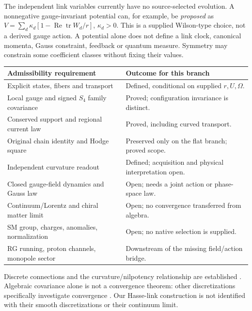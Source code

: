 \documentclass[11pt,a4paper]{article}
\newcommand{\tr}{\operatorname{tr}}
\begin{document}
The independent link variables currently have no source-selected
evolution. A nonnegative gauge-invariant potential can, for example,
be \emph{proposed} as
$V=\sum_d\kappa_d[1-\operatorname{Re}\tr W_d/r]$, $\kappa_d>0$.
This is a supplied Wilson-type choice, not a derived gauge action.
A potential alone does not define a link clock, canonical momenta,
Gauss constraint, feedback or quantum measure. Symmetry may constrain
some coefficient classes without fixing their values.

\begin{center}\small
\begin{tabular}{p{.35\linewidth}p{.56\linewidth}}
\toprule
Admissibility requirement & Outcome for this branch\\ \midrule
Explicit states, fibers and transport & Defined, conditional on supplied $r,U,\Omega$.\\
Local gauge and signed $S_4$ family covariance & Proved; configuration invariance is distinct.\\
Conserved support and regional current law & Proved, including curved transport.\\
Original chain identity and Hodge square & Preserved only on the flat branch; proved scope.\\
Independent curvature readout & Defined; acquisition and physical interpretation open.\\
Closed gauge-field dynamics and Gauss law & Open; needs a joint action or phase-space law.\\
Continuum/Lorentz and chiral matter limit & Open; no convergence transferred from algebra.\\
SM group, charges, anomalies, normalization & Open; no native selection is supplied.\\
RG running, proton channels, monopole sector & Downstream of the missing field/action bridge.\\
\bottomrule
\end{tabular}
\end{center}
Discrete connections and the curvature/nilpotency relationship are
established \cite{BEHS}. Algebraic covariance alone is not a convergence
theorem: other discretizations specifically investigate convergence
\cite{Braune}. Our Hasse-link construction is not identified with
their smooth discretizations or their continuum limit.
\end{document}
